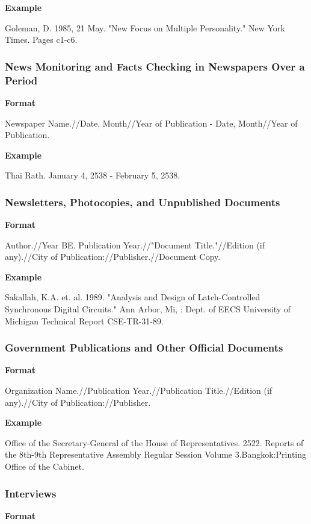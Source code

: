 \textbf{Example}

Goleman, D. 1985, 21 May. "New Focus on Multiple Personality." New York Times. Pages c1-c6.

\subsubsection{News Monitoring and Facts Checking in Newspapers Over a Period}

\textbf{Format}

Newspaper Name.//Date, Month//Year of Publication - Date, Month//Year of Publication.

\textbf{Example}

Thai Rath. January 4, 2538 - February 5, 2538.

\subsubsection{Newsletters, Photocopies, and Unpublished Documents}

\textbf{Format}

Author.//Year BE. Publication Year.//"Document Title."//Edition (if any).//City of Publication://Publisher.//Document Copy.

\textbf{Example}

Sakallah, K.A. et. al. 1989. "Analysis and Design of Latch-Controlled Synchronous Digital Circuits." Ann Arbor, Mi, : Dept. of EECS University of Michigan Technical Report CSE-TR-31-89.

\subsubsection{Government Publications and Other Official Documents}

\textbf{Format}

Organization Name.//Publication Year.//Publication Title.//Edition (if any).//City of Publication://Publisher.

\textbf{Example}

Office of the Secretary-General of the House of Representatives. 2522. Reports of the 8th-9th Representative Assembly Regular Session Volume 3.Bangkok:Printing Office of the Cabinet.

\subsubsection{Interviews}

\textbf{Format}

